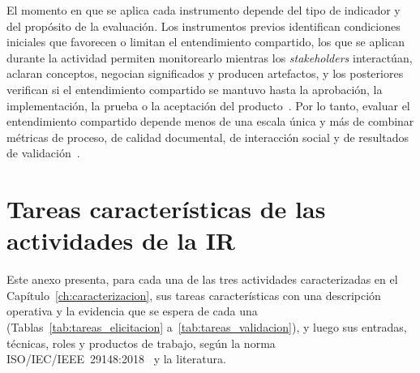 \documentclass[12pt,letterpaper,oneside]{report}
\begin{document}
El momento en que se aplica cada instrumento depende del tipo de indicador y
del propósito de la evaluación. Los instrumentos previos identifican
condiciones iniciales que favorecen o limitan el entendimiento compartido, los
que se aplican durante la actividad permiten monitorearlo mientras los
\textit{stakeholders} interactúan, aclaran conceptos, negocian significados y
producen artefactos, y los posteriores verifican si el
entendimiento compartido se mantuvo hasta la aprobación, la implementación, la prueba o la
aceptación del producto~\cite{pacheco2022}. Por lo tanto, evaluar el
entendimiento compartido depende menos de una escala única y más de combinar
métricas de proceso, de calidad documental, de interacción social y de
resultados de validación~\cite{fricker2015}.

\chapter{Tareas características de las actividades de la IR}
\label{anx:tareas_ir}
Este anexo presenta, para cada una de las tres actividades caracterizadas en el
Capítulo~\ref{ch:caracterizacion}, sus tareas características con una
descripción operativa y la evidencia que se espera de cada una
(Tablas~\ref{tab:tareas_elicitacion} a~\ref{tab:tareas_validacion}), y luego sus
entradas, técnicas, roles y productos de trabajo, según la norma
ISO/IEC/IEEE~29148:2018~\cite{iso29148} y la literatura.
\end{document}
